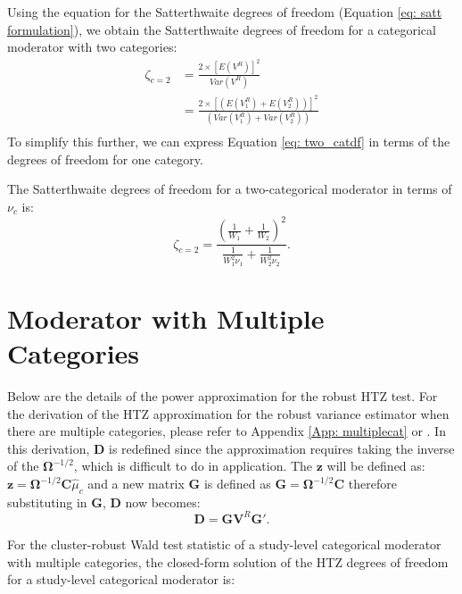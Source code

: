 Using the equation for the Satterthwaite degrees of freedom (Equation \ref{eq: satt formulation}), we obtain the Satterthwaite degrees of freedom for a categorical moderator with two categories:
\begin{equation} 
    \begin{split}
        \zeta_{c = 2} & = \frac{2 \times [E(V^R)]^2}{Var(V^R)} \\
              & = \frac{2 \times \left[ \left(E(V^R_1) + E(V^R_2)  \right) \right]^2}{\left(Var(V^R_1) + Var(V^R_2)  \right)} \\
    \end{split}
    \label{eq: two_catdf}
\end{equation}
To simplify this further, we can express Equation \ref{eq: two_catdf} in terms of the degrees of freedom for one category.

The Satterthwaite degrees of freedom for a two-categorical moderator in terms of $\nu_c$ is:
\begin{equation} \label{eq: two_catdf in nu_c df terms2}
    \zeta_{c=2} =
\frac{\left( \frac{1}{W_1} + \frac{1}{W_2} \right)^2}
{\frac{1}{W_1^2 \nu_1} + \frac{1}{W_2^2 \nu_2}}.
\end{equation}

\section{Moderator with Multiple Categories} \label{sec: mult categories}

Below are the details of the power approximation for the robust HTZ test. For the derivation of the HTZ approximation for the robust variance estimator when there are multiple categories, please refer to Appendix \ref{App: multiplecat} or \textcite{pustejovsky2024}. In this derivation, $\mathbf{D}$ is redefined since the approximation requires taking the inverse of the $\mathbf{\Omega}^{-1/2}$, which is difficult to do in application. The $\mathbf{z}$ will be defined as: $\mathbf{z} = \mathbf{\Omega}^{-1/2}\mathbf{C}\hat{\mu}_c $ and a new matrix $\bm{G}$ is defined as $\bm{G} = \bm{\Omega}^{-1/2}\mathbf{C} $ therefore substituting in $\bm{G}$, $\bm{D}$ now becomes:
\begin{equation}
    \mathbf{D} = \mathbf{G}\mathbf{V}^R\mathbf{G}'.
\end{equation}

For the cluster-robust Wald test statistic of a study-level categorical moderator with multiple categories, the closed-form solution of the HTZ degrees of freedom for a study-level categorical moderator is:

